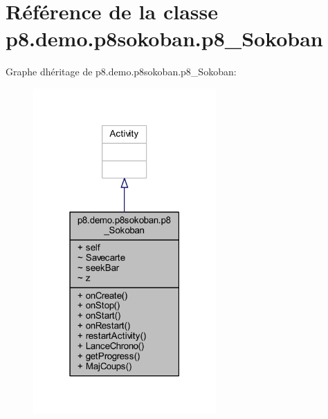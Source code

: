 \hypertarget{classp8_1_1demo_1_1p8sokoban_1_1p8___sokoban}{}\section{Référence de la classe p8.\+demo.\+p8sokoban.\+p8\+\_\+\+Sokoban}
\label{classp8_1_1demo_1_1p8sokoban_1_1p8___sokoban}


Graphe d\textquotesingle{}héritage de p8.\+demo.\+p8sokoban.\+p8\+\_\+\+Sokoban\+:
\nopagebreak
\begin{figure}[H]
\begin{center}
\leavevmode
\includegraphics[width=198pt]{classp8_1_1demo_1_1p8sokoban_1_1p8___sokoban__inherit__graph}
\end{center}
\end{figure}


